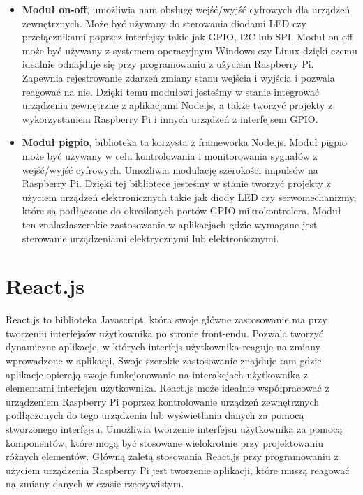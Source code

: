 \begin{itemize}  
	\item \textbf{Moduł on-off}, umożliwia nam obsługę wejść/wyjść cyfrowych dla urządzeń zewnętrznych. Może być używany do sterowania diodami LED czy przełącznikami poprzez interfejsy takie jak GPIO, I2C lub SPI. Moduł on-off może być używany z systemem operacyjnym Windows czy Linux dzięki czemu idealnie odnajduje się przy programowaniu z użyciem Raspberry Pi. Zapewnia rejestrowanie zdarzeń zmiany stanu wejścia i wyjścia i pozwala reagować na nie. Dzięki temu modułowi jesteśmy w stanie integrować urządzenia zewnętrzne z aplikacjami Node.js, a także tworzyć projekty z wykorzystaniem Raspberry Pi i innych urządzeń z interfejsem GPIO.
	\\
	\item \textbf{Moduł pigpio}, biblioteka ta korzysta z frameworka Node.js. Moduł pigpio może być używany w celu kontrolowania i monitorowania sygnałów z wejść/wyjść cyfrowych. Umożliwia modulację szerokości impulsów na Raspberry Pi. Dzięki tej bibliotece jesteśmy w stanie tworzyć projekty z użyciem urządzeń elektronicznych takie jak diody LED czy serwomechanizmy, które są podłączone do określonych portów GPIO mikrokontrolera. Moduł ten znalazłaszerokie zastosowanie w aplikacjach gdzie wymagane jest sterowanie urządzeniami elektrycznymi lub elektronicznymi.
	\\
\end{itemize}

\section{React.js}
React.js to biblioteka Javascript, która swoje główne zastosowanie ma przy tworzeniu interfejsów użytkownika po stronie front-endu. Pozwala tworzyć dynamiczne aplikacje, w których interfejs użytkownika reaguje na zmiany wprowadzone w aplikacji. Swoje szerokie zastosowanie znajduje tam gdzie aplikacje opierają swoje funkcjonowanie na interakcjach użytkownika z elementami interfejsu użytkownika. React.js może idealnie współpracować z urządzeniem Raspberry Pi poprzez kontrolowanie urządzeń zewnętrznych podłączonych do tego urządzenia lub wyświetlania danych za pomocą stworzonego interfejsu. Umożliwia tworzenie interfejsu użytkownika za pomocą komponentów, które mogą być stosowane wielokrotnie przy projektowaniu różnych elementów. Główną zaletą stosowania React.js przy programowaniu z użyciem urządzenia Raspberry Pi jest tworzenie aplikacji, które muszą reagować na zmiany danych w czasie rzeczywistym.  
\newpage
